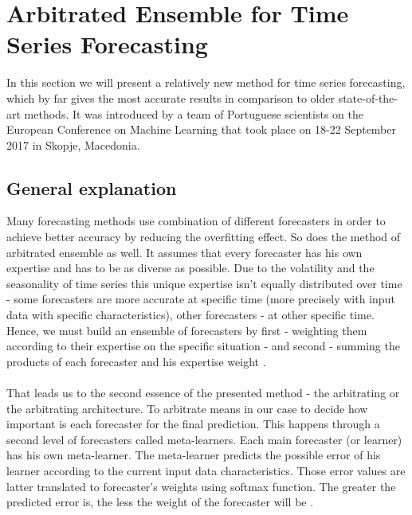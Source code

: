 \documentclass[runningheads,a4paper]{llncs}[2015/06/24]
\begin{document}
\section{Arbitrated Ensemble for Time Series Forecasting} In this section we will present a relatively new method for time series forecasting, which by far gives the most accurate results in comparison to older state-of-the-art methods. It was introduced by a team of Portuguese scientists on the European Conference on Machine Learning that took place on 18-22 September 2017 in Skopje, Macedonia. 

\subsection{General explanation}
Many forecasting methods use combination of different forecasters in order to achieve better accuracy by reducing the overfitting effect. So does the method of arbitrated ensemble as well. It assumes that every forecaster has his own expertise and has to be as diverse as possible. Due to the volatility and the seasonality of time series this unique expertise isn't equally distributed over time - some forecasters are more accurate at specific time (more precisely with input data with specific characteristics), other forecasters - at other specific time. Hence, we must build an ensemble of forecasters by first - weighting them according to their expertise on the specific situation - and second - summing the products of each forecaster and his expertise weight \cite{VtorCerqueira2017}. \\\\That leads us to the second essence of the presented method - the arbitrating or the arbitrating architecture. To arbitrate means in our case to decide how important is each forecaster for the final prediction. This happens through a second level of forecasters called meta-learners. Each main forecaster (or learner) has his own meta-learner. The meta-learner predicts the possible error of his learner according to the current input data characteristics. Those error values are latter  translated to forecaster's weights using  softmax function. The greater the predicted error is, the less the weight of the forecaster will be \cite{VtorCerqueira2017}.
\vspace{-\topsep}
\end{document}
